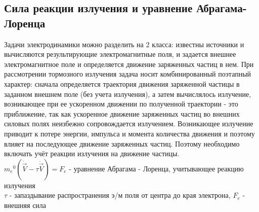 \begin{multicols*}{2}
		\section{Сила реакции излучения и уравнение Абрагама-Лоренца}
		Задачи электродинамики можно разделить на 2 класса: известны источники и вычисляются результирующие электромагнитные поля, и задается внешнее электромагнитное поле и определяется движение заряженных частиц в нем. При рассмотрении тормозного излучения задача носит комбинированный поэтапный характер: сначала определяется траектория движения заряженной частицы в заданном внешнем поле (без учета излучения), а затем вычислялось излучение, возникающее при ее ускоренном движении по полученной траектории - это приближение, так как ускоренное движение заряженных частиц во внешних силовых полях неизбежно сопровождается излучением. Возникающее излучение приводит к потере энергии, импульса и момента количества движения и поэтому влияет на последующее движение заряженных частиц. Поэтому необходимо включать учёт реакции излучения на движение частицы. \\
		${m_e}^0(\dot{\vec{V}} - \tau \ddot{\vec{V}}) = F_e$ - уравнение Абрагама - Лоренца, учитывающее реакцию излучения\\
		$\tau$ - запаздывание распространения э/м поля от центра до края электрона, \quad $F_e$ - внешняя сила

		
	\end{multicols*}

